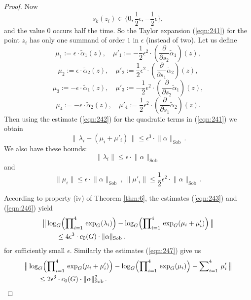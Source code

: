 \documentclass[10pt, a4paper]{amsart}
\theoremstyle{definition}
\numberwithin{equation}{section}
\newcommand{\mrm}[1]{\mathrm{#1}}
\newcommand{\smfrac}[2]{{\textstyle \frac{#1}{#2}}}
\newcommand{\bosum}{\sum\nolimits}
\newcommand{\boprod}{\prod\nolimits}
\newcommand{\til}[1]{\tilde{#1}}
\newcommand{\norm}[1]{\lVert #1 \rVert}
\newcommand{\Norm}[1]{\bigl\lVert\, #1 \, \bigr\rVert}
\begin{document}
\begin{proof}
Now 
\[ s_k(z_i) \in \{ 0, \smfrac{1}{2} \epsilon, 
-  \smfrac{1}{2} \epsilon \} , \]
and the value $0$ occurs half the time. So the Taylor expansion 
(\ref{eqn:241}) for the point $z_i$ has only one summand of order $1$ in 
$\epsilon$ (instead of two). Let us define
\[ \mu_1 := \epsilon \cdot \til{\alpha}_1(z) , \quad
\mu'_1 := - \smfrac{1}{2} \epsilon^2 \cdot
(\smfrac{\partial}{\partial s_2} \til{\alpha}_1)(z)  ,  \]
\[ \mu_2 := \epsilon \cdot \til{\alpha}_2(z) , \quad
\mu'_2 := \smfrac{1}{2} \epsilon^2 \cdot 
(\smfrac{\partial}{\partial s_1} \til{\alpha}_2) (z) , \]
\[ \mu_3 := - \epsilon \cdot \til{\alpha}_1(z) , \quad
\mu'_3 := - \smfrac{1}{2} \epsilon^2 \cdot 
(\smfrac{\partial}{\partial s_2} \til{\alpha}_1)(z) , \]
\[ \mu_4 := - \epsilon \cdot \til{\alpha}_2(z) , \quad
\mu'_4 := \smfrac{1}{2} \epsilon^2 \cdot 
(\smfrac{\partial}{\partial s_1} \til{\alpha}_2)(z) . \]
Then using the estimate (\ref{eqn:242}) for the quadratic terms 
in (\ref{eqn:241}) we obtain
\begin{equation} \label{eqn:243}
\Norm{ \lambda_i - (\mu_i + \mu'_i) } \leq \epsilon^3 \cdot
\norm{\alpha}_{\mrm{Sob}} \, . 
\end{equation}
We also have these bounds:
\begin{equation} \label{eqn:246}
\norm{ \lambda_i } \leq \epsilon \cdot \norm{\alpha}_{\mrm{Sob}} \,
\end{equation}
and
\begin{equation} \label{eqn:247}
\norm{ \mu_i } \leq \epsilon \cdot \norm{\alpha}_{\mrm{Sob}} \ , \
\norm{ \mu'_i } \leq  \smfrac{1}{2} \epsilon^2 \cdot \norm{\alpha}_{\mrm{Sob}}
\, .
\end{equation}

According to property (iv) of Theorem \ref{thm:6}, the estimates
(\ref{eqn:243}) and (\ref{eqn:246}) yield 
\begin{equation} \label{eqn:22}
\begin{aligned}
& \Norm{ \log_G \Bigl( \boprod_{i = 1}^{4} \, \exp_G(\lambda_i) \Bigr)
- \log_G \Bigl( \boprod_{i = 1}^{4} \, \exp_G(\mu_i + \mu'_i) \Bigr) } \\
& \quad \quad \leq 4 \epsilon^3 \cdot c_0(G) \cdot \norm{\alpha}_{\mrm{Sob}} \,
. 
\end{aligned}
\end{equation}
for sufficiently small $\epsilon$. Similarly the estimates (\ref{eqn:247}) give
us
\begin{equation} \label{eqn:244}
\begin{aligned}
& \Norm{ \log_G \Bigl( \boprod_{i = 1}^{4} \, \exp_G(\mu_i + \mu'_i) \Bigr)
- \log_G \Bigl( \boprod_{i = 1}^{4} \, \exp_G(\mu_i) \Bigr)
- \bosum_{i = 1}^{4} \, \mu'_i } \\
& \quad \quad \leq 2 \epsilon^3 \cdot c_0(G) \cdot \norm{\alpha}_{\mrm{Sob}}^2
\, . 
\end{aligned}
\end{equation}


\end{proof}
\end{document}

